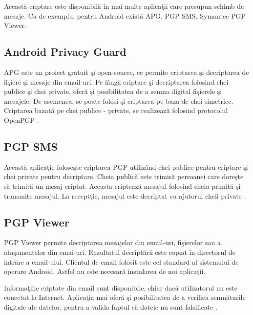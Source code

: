 	Aceast\u{a} criptare este disponibil\u{a} \^{i}n mai multe aplica\c{t}ii care presupun schimb de mesaje. Ca de exemplu, pentru Android exist\u{a} APG, PGP SMS, Symantec PGP Viewer. 

\subsection{Android Privacy Guard}

APG este un proiect gratuit \c{s}i open-source, ce permite criptarea \c{s}i decriptarea de fi\c{s}iere \c{s}i mesaje din email-uri. Pe l\^{a}ng\u{a} criptare \c{s}i decriptarea folosind chei publice \c{s}i chei private, ofer\u{a} \c{s}i posibilitatea de a semna digital fi\c{s}ierele \c{s}i mesajele. De asemenea, se poate folosi \c{s}i criptarea pe baza de chei simetrice. Criptarea bazat\u{a} pe chei publice - private, se realizeaz\u{a} folosind protocolul OpenPGP \cite{apg}.

\subsection{PGP SMS}

Aceast\u{a} aplica\c{t}ie folose\c{s}te criptarea PGP utiliz\^{a}nd chei publice pentru criptare \c{s}i chei private pentru decriptare. Cheia public\u{a} este trimis\u{a} persoanei care dore\c{s}te s\u{a} trimit\u{a} un mesaj criptat. Aceasta cripteaz\u{a} mesajul folosind cheia primit\u{a} \c{s}i transmite mesajul. La recept\c{t}ie, mesajul este decriptat cu ajutorul cheii private \cite{pgpsms}. 

\subsection{PGP Viewer}

PGP Viewer permite decriptarea mesajelor din email-uri, fi\c{s}ierelor sau a ata\c{s}amentelor din emai-uri. Rezultatul decript\u{a}rii este copiat \^{i}n directorul de intr\u{a}re a email-ului. Clientul de email folosit este cel standard al sistemului de operare Android. Astfel nu este necesar\u{a} instalarea de noi aplica\c{t}ii.

Informa\c{t}iile criptate din email sunt disponibile, chiar dac\u{a} utilizatorul nu este conectat la Internet. Aplica\c{t}ia mai ofer\u{a} \c{s}i posibilitatea de a verifica semn\u{a}turile digitale ale datelor, pentru a valida faptul c\u{a} datele nu sunt falsificate \cite{pgpviewer}.